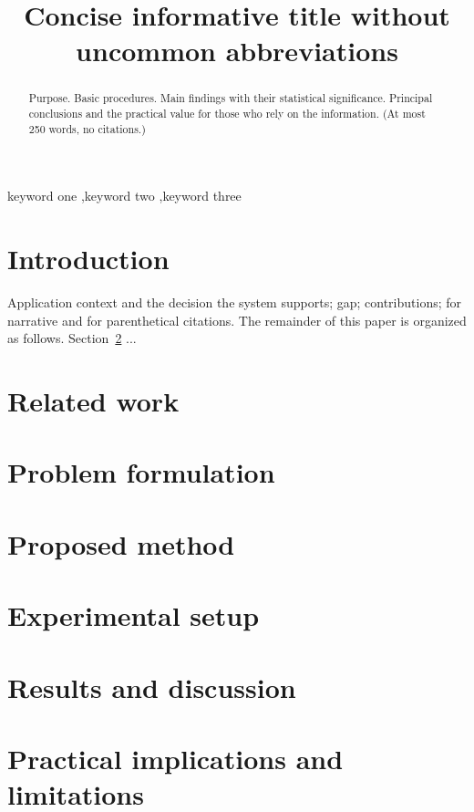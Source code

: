 \documentclass[preprint,12pt,authoryear]{elsarticle}
\begin{document}
\begin{frontmatter}
\title{Concise informative title without uncommon abbreviations}

\begin{abstract}
Purpose. Basic procedures. Main findings with their statistical significance.
Principal conclusions and the practical value for those who rely on the information.
(At most 250 words, no citations.)
\end{abstract}

\begin{keyword}
keyword one \sep keyword two \sep keyword three   %
\end{keyword}
\end{frontmatter}

\linenumbers

\section{Introduction}\label{sec:intro}
Application context and the decision the system supports; gap; contributions;
\citet{key} for narrative and \citep{key} for parenthetical citations.
The remainder of this paper is organized as follows. Section~\ref{sec:related} ...

\section{Related work}\label{sec:related}
\section{Problem formulation}\label{sec:problem}
\section{Proposed method}\label{sec:method}
\section{Experimental setup}\label{sec:setup}
\section{Results and discussion}\label{sec:results}
\section{Practical implications and limitations}\label{sec:implications}
\end{document}
